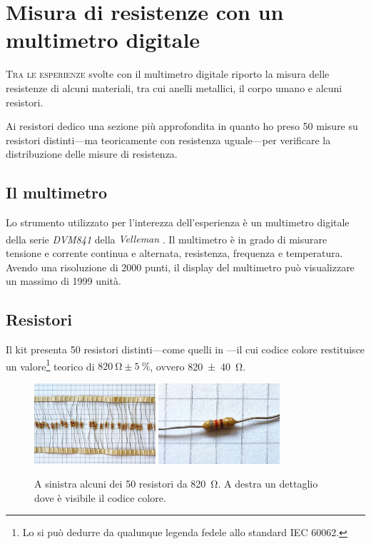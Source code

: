 \chapter{Misura di resistenze con un multimetro digitale}\label{ch:mult}
    \lettrine[loversize=0.08, lines=2]{T}{ra le esperienze} svolte con il multimetro digitale riporto la misura delle resistenze di alcuni materiali, tra cui anelli metallici, il corpo umano e alcuni resistori.

    Ai resistori dedico una sezione più approfondita in quanto ho preso \num{50} misure su resistori distinti---ma teoricamente con resistenza uguale---per verificare la distribuzione delle misure di resistenza.

    \section{Il multimetro}
        Lo strumento utilizzato per l'interezza dell'esperienza è un multimetro digitale della serie \emph{DVM841} della \emph{Velleman\textsuperscript{\textregistered}} \cite{velleman-dvm841}. Il multimetro è in grado di misurare tensione e corrente continua e alternata, resistenza, frequenza e temperatura. Avendo una risoluzione di \num{2000} punti, il display del multimetro può visualizzare un massimo di \num{1999} unità.
    \section{Resistori}
        Il kit presenta \num{50} resistori distinti---come quelli in ---il cui codice colore restituisce un valore\footnote{Lo si può dedurre da qualunque legenda fedele allo standard IEC 60062.} teorico di $\SI{820}{\ohm} \pm \SI{5}{\%}$, ovvero \SI{820(40)}{\ohm}.
        \begin{figure}
            \centering
            \includegraphics[width=0.4\textwidth]{images/multimetro/resistori.jpg}
            \hspace{0.05\textwidth}
            \includegraphics[width=0.4\textwidth]{images/multimetro/resistore.jpg}
            \caption{A sinistra alcuni dei \num{50} resistori da \SI{820}{\ohm}. A destra un dettaglio dove è visibile il codice colore.}
            \label{fig:mul:resistore}
        \end{figure}

